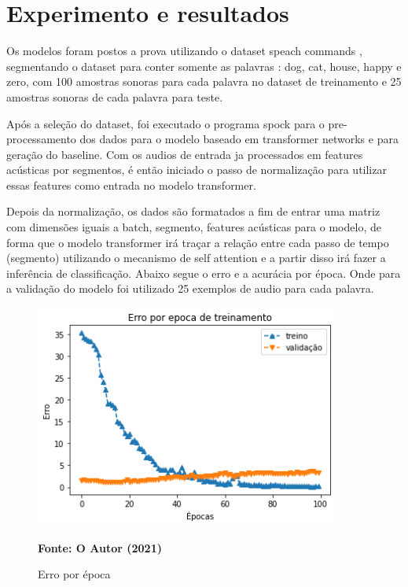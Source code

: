 \documentclass[
	12pt,				%
	openright,			%
	oneside,			%
	a4paper,			%
	chapter=TITLE,		%
	english,			%
	french,				%
	spanish,			%
	brazil				%
	]{abntex2}
\theoremstyle{definition}
\begin{document}
\chapter{Experimento e resultados}
\label{cap:implementacao}
Os modelos foram postos a prova utilizando o dataset speach commands , segmentando o dataset para conter somente as palavras : dog, cat, house, happy e zero, com 100 amostras sonoras para cada palavra no dataset de treinamento e 25 amostras sonoras de cada palavra para teste.

Após a seleção do dataset, foi executado o programa spock para o pre-processamento dos dados para o modelo baseado em transformer networks e para geração do baseline. Com os audios de entrada ja processados em features acústicas por segmentos, é então iniciado o passo de normalização para utilizar essas features como entrada no modelo transformer.

Depois da normalização, os dados são formatados a fim de entrar uma matriz com dimensões iguais a batch, segmento, features acústicas para o modelo, de forma que o modelo transformer irá traçar a relação entre cada passo de tempo (segmento) utilizando o mecanismo de self attention e a partir disso irá fazer a inferência de classificação.
Abaixo segue o erro e a acurácia por época. Onde para a validação do modelo foi utilizado 25 exemplos de audio para cada palavra.

\begin{figure}[!h]
	\caption{Erro por época}
	\label{fig:trans_pipe}
	\centering
	\includegraphics[width=10cm]{loss.png} \\
	\begin{small}\textbf{Fonte: O Autor (2021)}\end{small}
\end{figure}
\end{document}
